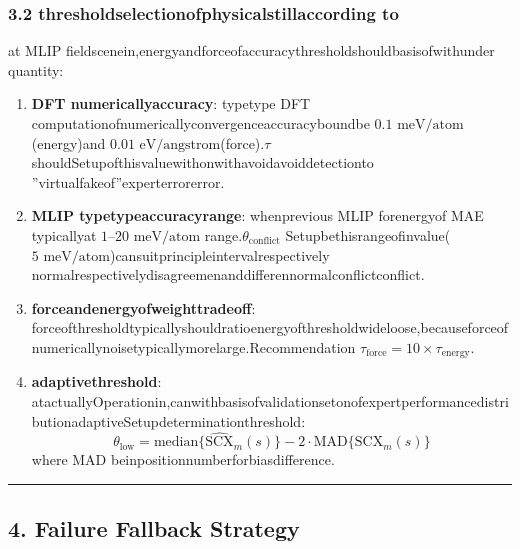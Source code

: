 \documentclass[
  12pt,
]{article}
\begin{document}
\subsubsection{3.2
thresholdselectionofphysicalstillaccording to}\label{ux9608ux503cux9009ux62e9ux7684ux7269ux7406ux4f9dux636e}

at MLIP fieldscenein,energyandforceofaccuracythresholdshouldbasisofwithunder quantity:

\begin{enumerate}
\def\labelenumi{\arabic{enumi}.}
\item
  \textbf{DFT numericallyaccuracy}: typetype DFT computationofnumericallyconvergenceaccuracyboundbe
  \(0.1\text{ meV/atom}\)(energy)and
  \(0.01\text{ eV/angstrom}\)(force).\(\tau\)
  shouldSetupofthisvaluewithonwithavoidavoiddetectionto ''virtualfakeof''experterrorerror.
\item
  \textbf{MLIP typetypeaccuracyrange}: whenprevious MLIP forenergyof MAE typicallyat
  \(1\text{--}20\text{ meV/atom}\) range.\(\theta_{\text{conflict}}\)
  Setupbethisrangeofinvalue(\(5\text{ meV/atom}\))cansuitprincipleintervalrespectively normalrespectivelydisagreemenanddifferennormalconflictconflict.
\item
  \textbf{forceandenergyofweighttradeoff}:
  forceofthresholdtypicallyshouldratioenergyofthresholdwideloose,becauseforceofnumericallynoisetypicallymorelarge.Recommendation
  \(\tau_{\text{force}} = 10 \times \tau_{\text{energy}}\).
\item
  \textbf{adaptivethreshold}:
  atactuallyOperationin,canwithbasisofvalidationsetonofexpertperformancedistributionadaptiveSetupdeterminationthreshold:
  \[\theta_{\text{low}} = \text{median}\{\widehat{\text{SCX}}_m(s)\} - 2 \cdot \text{MAD}\{\widehat{\text{SCX}}_m(s)\}\]
  where MAD beinpositionnumberforbiasdifference.
\end{enumerate}

\begin{center}\rule{0.5\linewidth}{0.5pt}\end{center}

\subsection{4. Failure Fallback Strategy}\label{ux5931ux8d25ux56deux9000ux7b56ux7565}
\end{document}
